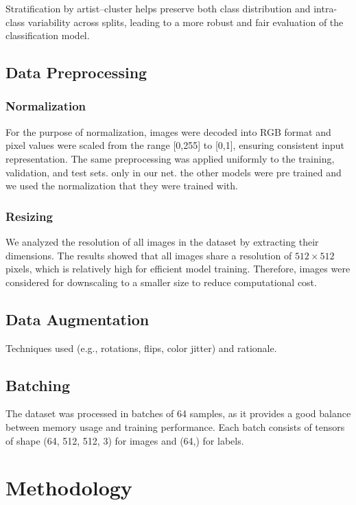 \documentclass[12pt,a4paper]{article}
\begin{document}
Stratification by artist–cluster helps preserve both class distribution and intra-class variability across splits, leading to a more robust and fair evaluation of the classification model.

\subsection{Data Preprocessing}
\subsubsection{Normalization}

For the purpose of normalization, images were decoded into RGB format and pixel values were scaled from the range [0,255] to [0,1], ensuring consistent input representation.
The same preprocessing was applied uniformly to the training, validation, and test sets. only in our net. the other models were pre trained and we used the normalization that they were trained with.

\subsubsection{Resizing}

We analyzed the resolution of all images in the dataset by extracting their dimensions. 
The results showed that all images share a resolution of $512 \times 512$ pixels, which is relatively high for efficient model training. 
Therefore, images were considered for downscaling to a smaller size to reduce computational cost.

\subsection{Data Augmentation}

Techniques used (e.g., rotations, flips, color jitter) and rationale.

\subsection{Batching}

The dataset was processed in batches of 64 samples, as it provides a good balance between memory usage and training performance. 
Each batch consists of tensors of shape (64, 512, 512, 3) for images and (64,) for labels.

\section{Methodology}
\end{document}

